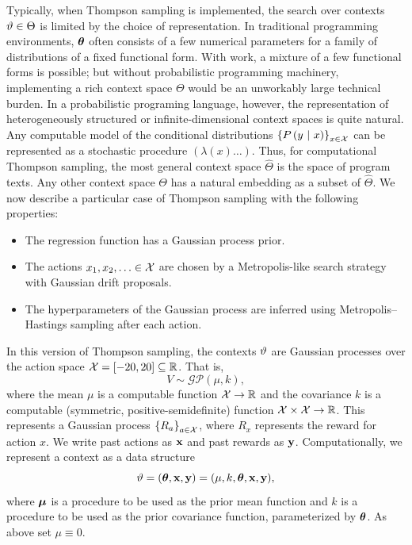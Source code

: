 Typically, when Thompson sampling is implemented, the search over contexts
$\vartheta \in \Theta$ is limited by the choice of representation.  In
traditional programming environments, $\bm{\theta}$ often consists of a few
numerical parameters for a family of distributions of a fixed functional
form.  With work, a mixture of a few functional forms is possible; but
without probabilistic programming machinery, implementing a rich context
space $\Theta$ would be an unworkably large technical burden.  In a
probabilistic programing language, however, the representation of
heterogeneously structured or infinite-dimensional context spaces is quite
natural.  Any computable model of the conditional distributions
$\left\{ P\left( y \ \middle\vert\  x \right) \right\}_{x \in \mathcal{X}}$ can be represented as a stochastic
procedure $(\lambda (x) \ldots)$.  Thus, for computational Thompson sampling,
the most general context space $\widehat\Theta$ is the space of program texts.
Any other context space $\Theta$ has a natural embedding as a subset of
$\widehat\Theta$.
\label{sec:math-spec}
We now describe a particular case of Thompson sampling with the following properties:
\begin{itemize}
  \item The regression function has a Gaussian process prior.
  \item The actions $x_1,x_2,\ldots \in \mathcal{X}$ are chosen by a Metropolis-like search
    strategy with Gaussian drift proposals.
  \item The hyperparameters of the Gaussian process are inferred using
    Metropolis--Hastings sampling after each action.
\end{itemize}

In this version of Thompson sampling, the contexts $\vartheta$ are Gaussian
processes over the action space $\mathcal{X} = [-20, 20] \subseteq \mathbb{R}$.  That is,
\[ V \sim \mathcal{GP}(\mu,k), \]
where the mean $\mu$ is a computable function $\mathcal{X} \to \mathbb{R}$ and the covariance
$k$ is a computable (symmetric, positive-semidefinite) function $\mathcal{X} \times
\mathcal{X} \to \mathbb{R}$.  This represents a Gaussian process $\left\{ R_a \right\}_{a \in \mathcal{X}}$,
where $R_x$ represents the reward for action $x$. We write past actions as
$\mathbf{x}$ and past rewards as $\mathbf{y}$. Computationally, we represent
a context as a data structure
\[ \vartheta = (\bm{\theta}, \mathbf{x}, \mathbf{y}) = (\mu, k,\bm{\theta}, \mathbf{x}, \mathbf{y}), \]
where $\bm{\mu}$ is a procedure to be used as the prior mean function and
$k$ is a procedure to be used as the prior covariance function, parameterized by 
$\bm{\theta}$.
As above set $\mu \equiv 0$.

